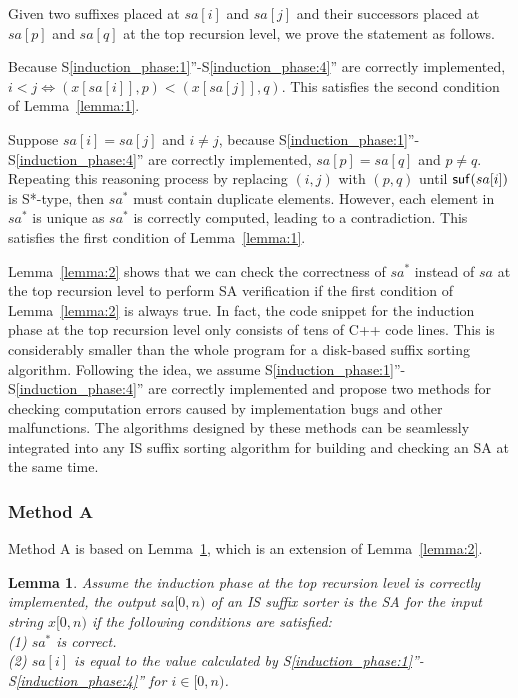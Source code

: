 \documentclass[10pt,journal,compsoc]{IEEEtran}
\newtheorem{lemma}[theorem]{Lemma}
\begin{document}
\begin{IEEEproof} Given two suffixes placed at $sa[i]$ and $sa[j]$ and their successors placed at $sa[p]$ and $sa[q]$ at the top recursion level, we prove the statement as follows.

Because S\ref{induction_phase:1}''-S\ref{induction_phase:4}'' are correctly implemented, $i < j \iff (x[sa[i]], p) < (x[sa[j]], q)$. This satisfies the second condition of Lemma~\ref{lemma:1}.

Suppose $sa[i] = sa[j]$ and $i \ne j$, because S\ref{induction_phase:1}''-S\ref{induction_phase:4}'' are correctly implemented, $sa[p] = sa[q]$ and $p \ne q$. Repeating this reasoning process by replacing $(i, j)$ with $(p, q)$ until ${\sf suf}(sa[i])$ is S*-type, then $sa^*$ must contain duplicate elements. However, each element in $sa^*$ is unique as $sa^*$ is correctly computed, leading to a contradiction. This satisfies the first condition of Lemma~\ref{lemma:1}.

\end{IEEEproof}

Lemma~\ref{lemma:2} shows that we can check the correctness of $sa^*$ instead of $sa$ at the top recursion level to perform SA verification if the first condition of Lemma~\ref{lemma:2} is always true. In fact, the code snippet for the induction phase at the top recursion level only consists of tens of C++ code lines. This is considerably smaller than the whole program for a disk-based suffix sorting algorithm. Following the idea, we assume S\ref{induction_phase:1}''-S\ref{induction_phase:4}'' are correctly implemented and propose two methods for checking computation errors caused by implementation bugs and other malfunctions. The algorithms designed by these methods can be seamlessly integrated into any IS suffix sorting algorithm for building and checking an SA at the same time.

\subsubsection{Method A} \label{sec:proposals:method_a}

Method A is based on Lemma~\ref{lemma:3}, which is an extension of Lemma~\ref{lemma:2}.

\begin{lemma} \label{lemma:3}
	Assume the induction phase at the top recursion level is correctly implemented, the output $sa[0, n)$ of an IS suffix sorter is the SA for the input string $x[0,  n)$ if the following conditions are satisfied: \\
	(1) $sa^*$ is correct. \\
	(2) $sa[i]$ is equal to the value calculated by S\ref{induction_phase:1}''-S\ref{induction_phase:4}'' for $i \in [0, n)$. \\
	
\end{lemma}
\end{document}
